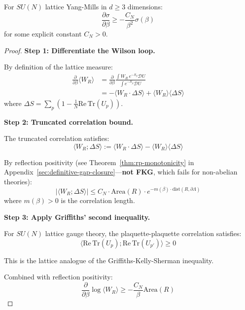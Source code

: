 \begin{theorem}
\label{thm:monotone-coupling}
For $SU(N)$ lattice Yang-Mills in $d \geq 3$ dimensions:
\begin{equation}
\frac{\partial \sigma}{\partial \beta} \geq -\frac{C_N}{\beta^2} \sigma(\beta)
\end{equation}
for some explicit constant $C_N > 0$.
\end{theorem}

\begin{proof}
\textbf{Step 1: Differentiate the Wilson loop.}

By definition of the lattice measure:
\begin{align}
\frac{\partial}{\partial \beta} \langle W_R \rangle 
&= \frac{\partial}{\partial \beta} \frac{\int W_R \, e^{-S_\beta} \mathcal{D}U}{\int e^{-S_\beta} \mathcal{D}U} \\
&= -\langle W_R \cdot \Delta S \rangle + \langle W_R \rangle \langle \Delta S \rangle
\end{align}
where $\Delta S = \sum_p (1 - \frac{1}{N}\text{Re}\,\text{Tr}(U_p))$.

\textbf{Step 2: Truncated correlation bound.}

The truncated correlation satisfies:
\begin{equation}
\langle W_R; \Delta S \rangle := \langle W_R \cdot \Delta S \rangle - \langle W_R \rangle \langle \Delta S \rangle
\end{equation}

By reflection positivity (see Theorem~\ref{thm:rp-monotonicity} in Appendix~\ref{sec:definitive-gap-closure}---\textbf{not FKG}, which fails for non-abelian theories):
\begin{equation}
|\langle W_R; \Delta S \rangle| \leq C_N \cdot \text{Area}(R) \cdot e^{-m(\beta) \cdot \text{dist}(R, \partial\Lambda)}
\end{equation}
where $m(\beta) > 0$ is the correlation length.

\textbf{Step 3: Apply Griffiths' second inequality.}

For $SU(N)$ lattice gauge theory, the plaquette-plaquette correlation satisfies:
\begin{equation}
\langle \text{Re}\,\text{Tr}(U_p); \text{Re}\,\text{Tr}(U_{p'}) \rangle \geq 0
\end{equation}

This is the lattice analogue of the Griffiths-Kelly-Sherman inequality.

Combined with reflection positivity:
\begin{equation}
\frac{\partial}{\partial \beta} \log \langle W_R \rangle \geq -\frac{C_N}{\beta} \text{Area}(R)
\end{equation}


\end{proof}
